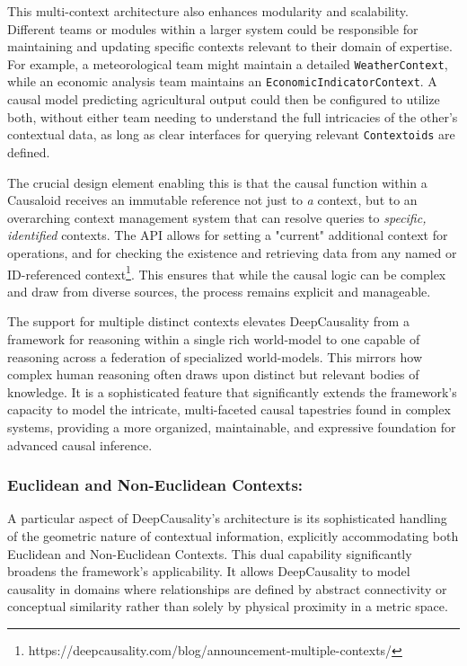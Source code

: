 This multi-context architecture also enhances modularity and scalability. Different teams or modules within a larger system could be responsible for maintaining and updating specific contexts relevant to their domain of expertise. For example, a meteorological team might maintain a detailed \texttt{WeatherContext}, while an economic analysis team maintains an \texttt{EconomicIndicatorContext}. A causal model predicting agricultural output could then be configured to utilize both, without either team needing to understand the full intricacies of the other's contextual data, as long as clear interfaces for querying relevant \texttt{Contextoids} are defined.

The crucial design element enabling this is that the causal function within a Causaloid receives an immutable reference not just to \textit{a} context, but to an overarching context management system that can resolve queries to \textit{specific, identified} contexts. The API allows for setting a "current" additional context for operations, and for checking the existence and retrieving data from any named or ID-referenced context\footnote{https://deepcausality.com/blog/announcement-multiple-contexts/}. This ensures that while the causal logic can be complex and draw from diverse sources, the process remains explicit and manageable.

The support for multiple distinct contexts elevates DeepCausality from a framework for reasoning within a single rich world-model to one capable of reasoning across a federation of specialized world-models. This mirrors how complex human reasoning often draws upon distinct but relevant bodies of knowledge. It is a sophisticated feature that significantly extends the framework's capacity to model the intricate, multi-faceted causal tapestries found in complex systems, providing a more organized, maintainable, and expressive foundation for advanced causal inference.

\subsubsection{Euclidean and Non-Euclidean Contexts:}


A particular aspect of DeepCausality's architecture is its sophisticated handling of the geometric nature of contextual information, explicitly accommodating both Euclidean and Non-Euclidean Contexts. This dual capability significantly broadens the framework's applicability. It allows DeepCausality to model causality in domains where relationships are defined by abstract connectivity or  conceptual similarity rather than solely by physical proximity in a metric space.


